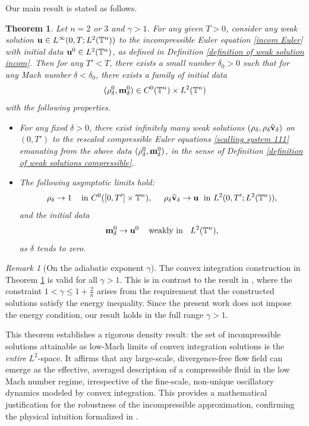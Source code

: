 \documentclass[12pt,reqno]{amsart}
\newtheorem{Theorem}{Theorem}[section]
\theoremstyle{definition}
\theoremstyle{remark}
\newtheorem{Remark}{Remark}[section]
\numberwithin{equation}{section}
\renewcommand{\u}{{\bf u}}
\renewcommand{\v}{{\bf v}}
\newcommand{\m}{{\bf m}}
\begin{document}
 \smallskip
 
Our main result is stated as follows.
\begin{Theorem}
\label{main result}
Let $n = 2$ or $3$ and $\gamma > 1$. For any given $T > 0$, consider any weak solution $\u\in L^\infty(0,T;L^2(\mathbb{T}^n))$ to the incompressible Euler equation \eqref{incom Euler} with initial data $\u^0\in L^2(\mathbb{T}^n)$, as defined in Definition \ref{definition of weak solution incom}. Then for any $T' < T$, 
 there exists a small number $\delta_0>0$  such that for any Mach number $\delta<\delta_0$, there exists a family of initial data 
$$
(\rho_{\delta}^0,\m_{\delta}^0)\in C^0(\mathbb{T}^n)\times  L^2(\mathbb{T}^n)
$$
with the following properties.
\begin{itemize}
\item For any fixed $\delta>0$, there exist infinitely many weak solutions $(\rho_{\delta},\rho_{\delta}\widehat{\v}_{\delta})$ on $(0, T')$ to the rescaled compressible Euler equations \eqref{scalling system 111} emanating from the above data $(\rho_{\delta}^0,\m_{\delta}^0)$, in the sense of Definition \ref{definition of weak solutions compressible}.
\item The following asymptotic limits hold:
\begin{equation*}
\rho_{\delta}\to 1\;\;\;\text{ in } C^0([0,T']\times \mathbb{T}^n),\;\;\;\;\; \rho_{\delta}\widehat{\v}_{\delta}\to \u \;\text{ in } L^{2}(0,T';L^2(\mathbb{T}^n)),
\end{equation*}
and the initial data 
$$
\m_{\delta}^0\to \u^0\;\;\;\text{ weakly in }\;\; L^2(\mathbb{T}^n),
$$
as $\delta$ tends to zero.
\end{itemize}
\end{Theorem}
\begin{Remark}[On the adiabatic exponent $\gamma$]
The convex integration construction in Theorem \ref{main result} is valid for all $\gamma > 1$. This is in contrast to the result in \cite[Theorem 1.1]{CVY}, where the constraint $1 < \gamma \le 1 + \tfrac2n$ arises from the requirement that the constructed solutions satisfy the energy inequality. Since the present work does not impose the energy condition, our result holds in the full range $\gamma > 1$. 
\end{Remark}

This theorem establishes a rigorous density result: the set of incompressible solutions attainable as low-Mach limits of convex integration solutions is the \emph{entire} $L^2$-space. It affirms that any large-scale, divergence-free flow field can emerge as the effective, averaged description of a compressible fluid in the low Mach number regime, irrespective of the fine-scale, non-unique oscillatory dynamics modeled by convex integration. This provides a mathematical justification for the robustness of the incompressible approximation, confirming the physical intuition formalized in \cite{KM2, Majda, MaS}.
\end{document}
